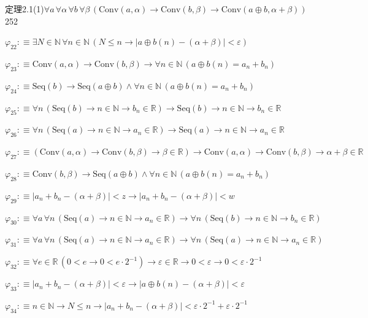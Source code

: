 \begin{fullproof}{定理2.1(1)}{$\forall a\,\forall \alpha\,\forall b\,\forall \beta\,(\mathrm{Conv}(a,\alpha) \to \mathrm{Conv}(b,\beta) \to \mathrm{Conv}(a \oplus b,\alpha + \beta))$}{252}
\begin{abbrevlist}
\item $\varphi_{22} :\equiv \exists N \in \mathbb{N}\,\forall n \in \mathbb{N}\,(N \leq n \to \lvert a \oplus b(n) - (\alpha + \beta) \rvert < \varepsilon)$
\item $\varphi_{23} :\equiv \mathrm{Conv}(a,\alpha) \to \mathrm{Conv}(b,\beta) \to \forall n \in \mathbb{N}\,(a \oplus b(n) = a_{n} + b_{n})$
\item $\varphi_{24} :\equiv \mathrm{Seq}(b) \to \mathrm{Seq}(a \oplus b) \land \forall n \in \mathbb{N}\,(a \oplus b(n) = a_{n} + b_{n})$
\item $\varphi_{25} :\equiv \forall n\,(\mathrm{Seq}(b) \to n \in \mathbb{N} \to b_{n} \in \mathbb{R}) \to \mathrm{Seq}(b) \to n \in \mathbb{N} \to b_{n} \in \mathbb{R}$
\item $\varphi_{26} :\equiv \forall n\,(\mathrm{Seq}(a) \to n \in \mathbb{N} \to a_{n} \in \mathbb{R}) \to \mathrm{Seq}(a) \to n \in \mathbb{N} \to a_{n} \in \mathbb{R}$
\item $\varphi_{27} :\equiv (\mathrm{Conv}(a,\alpha) \to \mathrm{Conv}(b,\beta) \to \beta \in \mathbb{R}) \to \mathrm{Conv}(a,\alpha) \to \mathrm{Conv}(b,\beta) \to \alpha + \beta \in \mathbb{R}$
\item $\varphi_{28} :\equiv \mathrm{Conv}(b,\beta) \to \mathrm{Seq}(a \oplus b) \land \forall n \in \mathbb{N}\,(a \oplus b(n) = a_{n} + b_{n})$
\item $\varphi_{29} :\equiv \lvert a_{n} + b_{n} - (\alpha + \beta) \rvert < z \to \lvert a_{n} + b_{n} - (\alpha + \beta) \rvert < w$
\item $\varphi_{30} :\equiv \forall a\,\forall n\,(\mathrm{Seq}(a) \to n \in \mathbb{N} \to a_{n} \in \mathbb{R}) \to \forall n\,(\mathrm{Seq}(b) \to n \in \mathbb{N} \to b_{n} \in \mathbb{R})$
\item $\varphi_{31} :\equiv \forall a\,\forall n\,(\mathrm{Seq}(a) \to n \in \mathbb{N} \to a_{n} \in \mathbb{R}) \to \forall n\,(\mathrm{Seq}(a) \to n \in \mathbb{N} \to a_{n} \in \mathbb{R})$
\item $\varphi_{32} :\equiv \forall e \in \mathbb{R}\,(0 < e \to 0 < e \cdot 2^{-1}) \to \varepsilon \in \mathbb{R} \to 0 < \varepsilon \to 0 < \varepsilon \cdot 2^{-1}$
\item $\varphi_{33} :\equiv \lvert a_{n} + b_{n} - (\alpha + \beta) \rvert < \varepsilon \to \lvert a \oplus b(n) - (\alpha + \beta) \rvert < \varepsilon$
\item $\varphi_{34} :\equiv n \in \mathbb{N} \to N \leq n \to \lvert a_{n} + b_{n} - (\alpha + \beta) \rvert < \varepsilon \cdot 2^{-1} + \varepsilon \cdot 2^{-1}$

\end{abbrevlist}
\end{fullproof}
